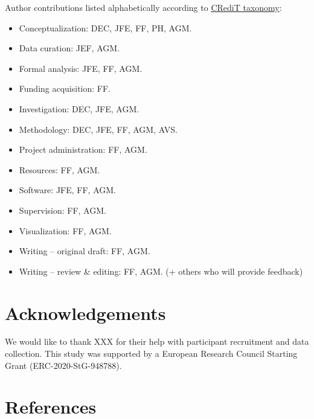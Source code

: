 \documentclass[
]{article}
\providecommand{\tightlist}{%
  \setlength{\itemsep}{0pt}\setlength{\parskip}{0pt}}
\begin{document}
Author contributions listed alphabetically according to
\href{https://credit.niso.org}{CRediT taxonomy}:

\begin{itemize}
\tightlist
\item
  Conceptualization: DEC, JFE, FF, PH, AGM.
\item
  Data curation: JEF, AGM.
\item
  Formal analysis: JFE, FF, AGM.
\item
  Funding acquisition: FF.
\item
  Investigation: DEC, JFE, AGM.
\item
  Methodology: DEC, JFE, FF, AGM, AVS.
\item
  Project administration: FF, AGM.
\item
  Resources: FF, AGM.
\item
  Software: JFE, FF, AGM.
\item
  Supervision: FF, AGM.
\item
  Visualization: FF, AGM.
\item
  Writing -- original draft: FF, AGM.
\item
  Writing -- review \& editing: FF, AGM. (+ others who will provide
  feedback)
\end{itemize}

\hypertarget{acknowledgements}{%
\section{Acknowledgements}\label{acknowledgements}}

We would like to thank XXX for their help with participant recruitment
and data collection. This study was supported by a European Research
Council Starting Grant (ERC-2020-StG-948788).

\newpage

\hypertarget{references}{%
\section{References}\label{references}}
\end{document}
